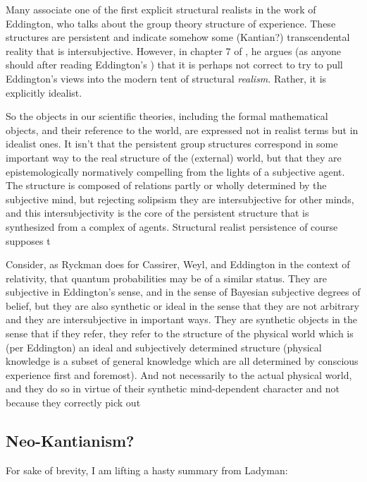Many associate one of the first explicit structural realists in the work of Eddington, who talks about the group theory structure of experience.  These structures are persistent and indicate somehow some  (Kantian?) transcendental reality that is intersubjective.  However, in chapter 7 of \cite{Ryckman2005}, he argues (as anyone should after reading Eddington's \cite{Eddington1939}) that it is perhaps not correct to try to pull Eddington's views into the modern tent of structural \emph{realism}.  Rather, it is explicitly idealist.  

So the objects in our scientific theories, including the formal mathematical objects, and their reference to the world, are expressed not in realist terms but in idealist ones.  It isn't that the persistent group structures correspond in some important way to the real structure of the (external) world, but that they are epistemologically normatively compelling from the lights of a subjective agent.  The structure is composed of relations partly or wholly determined by the subjective mind, but rejecting solipsism they are intersubjective for other minds, and this intersubjectivity is the core of the persistent structure that is synthesized from a complex of agents.  Structural realist persistence of course supposes t



Consider, as Ryckman does for Cassirer, Weyl, and Eddington in the context of relativity, that quantum probabilities may be of a similar status.  They are subjective in Eddington's sense, and in the sense of Bayesian subjective degrees of belief, but they are also synthetic or ideal in the sense that they are not arbitrary and they are intersubjective in important ways.  They are synthetic objects in the sense that if they refer, they refer to the structure of the physical world which is (per Eddington) an ideal and subjectively determined structure (physical knowledge is a subset of general knowledge which are all determined by conscious experience first and foremost).  And not necessarily to the actual physical world, and they do so in virtue of their synthetic mind-dependent character and not because they correctly pick out 





\subsection{Neo-Kantianism?}

For sake of brevity, I am lifting a hasty summary from Ladyman:


